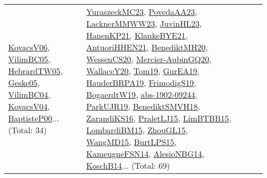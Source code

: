 {\begin{longtable}{lp{3cm}>{\raggedright}p{6cm}>{\raggedright}p{6cm}p{8cm}}
\href{papers/KovacsV06.pdf}{KovacsV06}\cite{KovacsV06}, \href{articles/VilimBC05.pdf}{VilimBC05}\cite{VilimBC05}, \href{papers/HebrardTW05.pdf}{HebrardTW05}\cite{HebrardTW05}, \href{papers/Geske05.pdf}{Geske05}\cite{Geske05}, \href{papers/VilimBC04.pdf}{VilimBC04}\cite{VilimBC04}, \href{papers/KovacsV04.pdf}{KovacsV04}\cite{KovacsV04}, \href{articles/BaptisteP00.pdf}{BaptisteP00}\cite{BaptisteP00}... (Total: 34) & \href{papers/YuraszeckMC23.pdf}{YuraszeckMC23}\cite{YuraszeckMC23}, \href{papers/PovedaAA23.pdf}{PovedaAA23}\cite{PovedaAA23}, \href{articles/LacknerMMWW23.pdf}{LacknerMMWW23}\cite{LacknerMMWW23}, \href{papers/JuvinHL23.pdf}{JuvinHL23}\cite{JuvinHL23}, \href{papers/HanenKP21.pdf}{HanenKP21}\cite{HanenKP21}, \href{papers/KlankeBYE21.pdf}{KlankeBYE21}\cite{KlankeBYE21}, \href{papers/AntuoriHHEN21.pdf}{AntuoriHHEN21}\cite{AntuoriHHEN21}, \href{articles/BenediktMH20.pdf}{BenediktMH20}\cite{BenediktMH20}, \href{papers/WessenCS20.pdf}{WessenCS20}\cite{WessenCS20}, \href{papers/Mercier-AubinGQ20.pdf}{Mercier-AubinGQ20}\cite{Mercier-AubinGQ20}, \href{articles/WallaceY20.pdf}{WallaceY20}\cite{WallaceY20}, \href{papers/Tom19.pdf}{Tom19}\cite{Tom19}, \href{articles/GurEA19.pdf}{GurEA19}\cite{GurEA19}, \href{articles/HauderBRPA19.pdf}{HauderBRPA19}\cite{HauderBRPA19}, \href{papers/FrimodigS19.pdf}{FrimodigS19}\cite{FrimodigS19}, \href{papers/BogaerdtW19.pdf}{BogaerdtW19}\cite{BogaerdtW19}, \href{articles/abs-1902-09244.pdf}{abs-1902-09244}\cite{abs-1902-09244}, \href{papers/ParkUJR19.pdf}{ParkUJR19}\cite{ParkUJR19}, \href{papers/BenediktSMVH18.pdf}{BenediktSMVH18}\cite{BenediktSMVH18}, \href{articles/ZarandiKS16.pdf}{ZarandiKS16}\cite{ZarandiKS16}, \href{papers/PraletLJ15.pdf}{PraletLJ15}\cite{PraletLJ15}, \href{papers/LimBTBB15.pdf}{LimBTBB15}\cite{LimBTBB15}, \href{papers/LombardiBM15.pdf}{LombardiBM15}\cite{LombardiBM15}, \href{papers/ZhouGL15.pdf}{ZhouGL15}\cite{ZhouGL15}, \href{articles/WangMD15.pdf}{WangMD15}\cite{WangMD15}, \href{papers/BurtLPS15.pdf}{BurtLPS15}\cite{BurtLPS15}, \href{articles/KameugneFSN14.pdf}{KameugneFSN14}\cite{KameugneFSN14}, \href{papers/AlesioNBG14.pdf}{AlesioNBG14}\cite{AlesioNBG14}, \href{papers/KoschB14.pdf}{KoschB14}\cite{KoschB14}... (Total: 69)\\

\end{longtable}}
